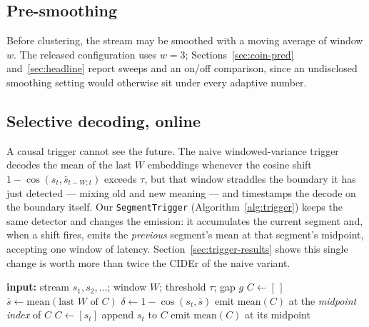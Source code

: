 \documentclass[journal]{IEEEtran}
\begin{document}
\subsection{Pre-smoothing}
Before clustering, the stream may be smoothed with a moving average of window $w$.
The released configuration uses $w=3$; Sections~\ref{sec:coin-pred}
and~\ref{sec:headline} report sweeps and an on/off comparison, since an undisclosed
smoothing setting would otherwise sit under every adaptive number.

\subsection{Selective decoding, online}
A causal trigger cannot see the future. The naive windowed-variance trigger
decodes the mean of the last $W$ embeddings whenever the cosine shift
$1-\cos(s_t, \bar{s}_{t-W:t})$ exceeds $\tau$, but that window straddles the
boundary it has just detected --- mixing old and new meaning --- and timestamps
the decode on the boundary itself. Our \texttt{SegmentTrigger}
(Algorithm~\ref{alg:trigger}) keeps the same detector and changes the emission:
it accumulates the current segment and, when a shift fires, emits the
\emph{previous} segment's mean at that segment's midpoint, accepting one window of
latency. Section~\ref{sec:trigger-results} shows this single change is worth more
than twice the CIDEr of the naive variant.

\begin{algorithm}[t]
\caption{\texttt{SegmentTrigger} (causal, retrospective emission)}
\label{alg:trigger}
\begin{algorithmic}[1]
\STATE \textbf{input:} stream $s_1,s_2,\dots$; window $W$; threshold $\tau$; gap $g$
\STATE $C \leftarrow [\,]$ 
  \STATE $\bar{s} \leftarrow \mathrm{mean}(\text{last } W \text{ of } C)$
  \STATE $\delta \leftarrow 1-\cos(s_t,\bar{s})$ 
    \STATE emit $\mathrm{mean}(C)$ at the \emph{midpoint index} of $C$
    \STATE $C \leftarrow [s_t]$ 
  \ELSE
    \STATE append $s_t$ to $C$
  \ENDIF
\ENDFOR
\STATE emit $\mathrm{mean}(C)$ at its midpoint 
\end{algorithmic}
\end{algorithm}
\end{document}
